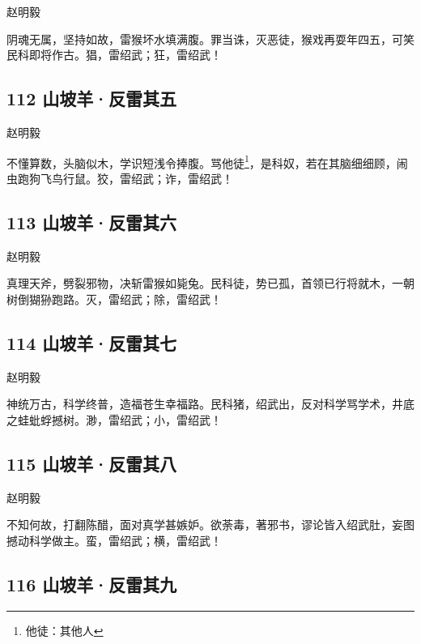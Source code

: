 {赵明毅}

阴魂无属，坚持如故，雷猴坏水填满腹。罪当诛，灭恶徒，猴戏再耍年四五，可笑民科即将作古。猖，雷绍武；狂，雷绍武！

\hypertarget{ux5c71ux5761ux7f8aux53cdux96f7ux5176ux4e94}{%
\subsection{112
山坡羊·反雷其五}\label{ux5c71ux5761ux7f8aux53cdux96f7ux5176ux4e94}}

{赵明毅}

不懂算数，头脑似木，学识短浅令捧腹。骂他徒\footnote{他徒：其他人}，是科奴，若在其脑细细顾，闹虫跑狗飞鸟行鼠。狡，雷绍武；诈，雷绍武！
~\\

\hypertarget{ux5c71ux5761ux7f8aux53cdux96f7ux5176ux516d}{%
\subsection{113
山坡羊·反雷其六}\label{ux5c71ux5761ux7f8aux53cdux96f7ux5176ux516d}}

{赵明毅}

真理天斧，劈裂邪物，决斩雷猴如毙兔。民科徒，势已孤，首领已行将就木，一朝树倒猢狲跑路。灭，雷绍武；除，雷绍武！
~\\

\hypertarget{ux5c71ux5761ux7f8aux53cdux96f7ux5176ux4e03}{%
\subsection{114
山坡羊·反雷其七}\label{ux5c71ux5761ux7f8aux53cdux96f7ux5176ux4e03}}

{赵明毅}

神统万古，科学终普，造福苍生幸福路。民科猪，绍武出，反对科学骂学术，井底之蛙蚍蜉撼树。渺，雷绍武；小，雷绍武！

\hypertarget{ux5c71ux5761ux7f8aux53cdux96f7ux5176ux516b}{%
\subsection{115
山坡羊·反雷其八}\label{ux5c71ux5761ux7f8aux53cdux96f7ux5176ux516b}}

{赵明毅}

不知何故，打翻陈醋，面对真学甚嫉妒。欲荼毒，著邪书，谬论皆入绍武肚，妄图撼动科学做主。蛮，雷绍武；横，雷绍武！
~\\

\hypertarget{ux5c71ux5761ux7f8aux53cdux96f7ux5176ux4e5d}{%
\subsection{116
山坡羊·反雷其九}\label{ux5c71ux5761ux7f8aux53cdux96f7ux5176ux4e5d}}

